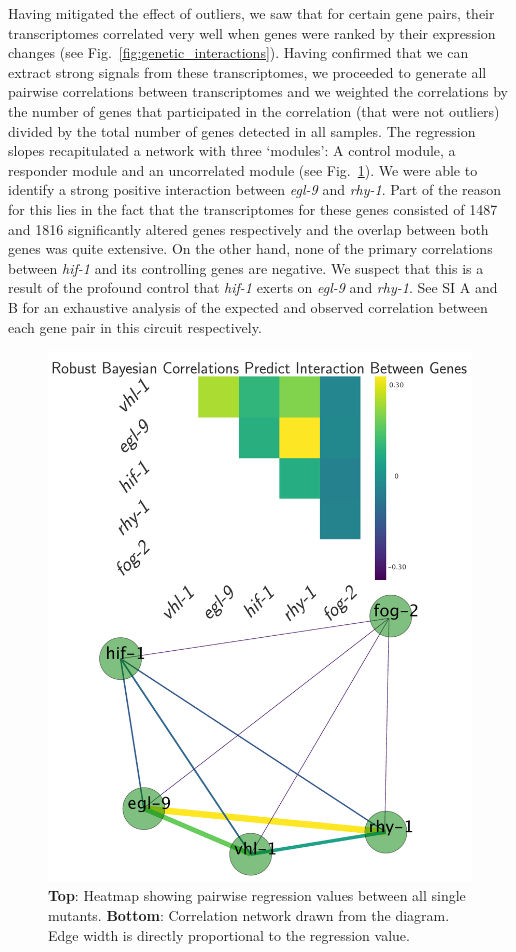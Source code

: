\documentclass[9pt,twocolumn,twoside]{pnas-new}
\newcommand{\egl}{\emph{egl-9}}
\newcommand{\rhy}{\emph{rhy-1}}
\newcommand{\hif}{\emph{hif-1}}
\newcommand{\egln}{1487}
\newcommand{\rhyn}{1816}
\begin{document}
Having mitigated the effect of outliers, we saw that for certain gene pairs, their transcriptomes correlated very well when genes were ranked by their expression changes (see Fig.~\ref{fig:genetic_interactions}). Having confirmed that we can extract strong signals from these transcriptomes, we proceeded to generate all pairwise correlations between transcriptomes and we weighted the correlations by the number of genes that participated in the correlation (that were not outliers) divided by the total number of genes detected in all samples.
The regression slopes recapitulated a network with three `modules': A control module, a responder module and an uncorrelated module (see Fig.~\ref{fig:heatmap}). We were able to identify a strong positive interaction between \egl{} and \rhy{}. Part of the reason for this lies in the fact that the transcriptomes for these genes consisted of \egln{} and \rhyn{} significantly altered genes respectively and the overlap between both genes was quite extensive.
On the other hand, none of the primary correlations between \hif{} and its controlling genes are negative. We suspect that this is a result of the profound control that \hif{} exerts on \egl{} and \rhy{}. See SI A and B for an exhaustive analysis of the expected and observed correlation between each gene pair in this circuit respectively.
\begin{figure}[tbhp]
\centering
\includegraphics[width=0.85\linewidth]{figs/bayesian_heat_map.pdf}
\caption{\textbf{Top}: Heatmap showing pairwise regression values between all single mutants. \textbf{Bottom}: Correlation network drawn from the diagram. Edge width is directly proportional to the regression value.}
\label{fig:heatmap}
\end{figure}
\end{document}
